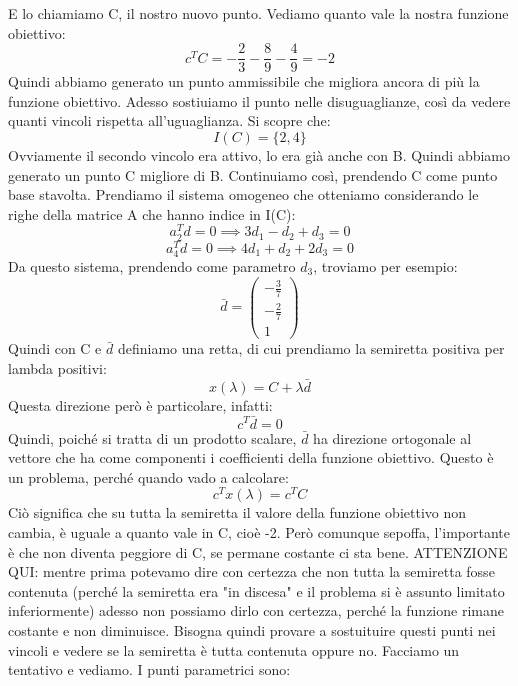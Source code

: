 E lo chiamiamo C, il nostro nuovo punto. Vediamo quanto vale la nostra funzione obiettivo:
\begin{equation*}
    c^TC = -\frac{2}{3}-\frac{8}{9}-\frac{4}{9} = -2
\end{equation*}
Quindi abbiamo generato un punto ammissibile che migliora ancora di più la funzione obiettivo. Adesso sostiuiamo il punto nelle disuguaglianze, così da vedere quanti vincoli rispetta all'uguaglianza. Si scopre che:
\begin{equation*}
    I(C) = \{2,4\}
\end{equation*}
Ovviamente il secondo vincolo era attivo, lo era già anche con B. Quindi abbiamo generato un punto C migliore di B. Continuiamo così, prendendo C come punto base stavolta. Prendiamo il sistema omogeneo che otteniamo considerando le righe della matrice A che hanno indice in I(C):
\begin{equation*}
    a_2^Td = 0 \implies 3d_1 - d_2 + d_3 = 0
\end{equation*}
\begin{equation*}
    a_4^Td = 0 \implies 4d_1 + d_2 + 2d_3 = 0
\end{equation*}
Da questo sistema, prendendo come parametro $d_3$, troviamo per esempio:
\begin{equation*}
    \bar{d} = \begin{pmatrix}
        -\frac{3}{7}\\
        -\frac{2}{7}\\
        1
    \end{pmatrix}
\end{equation*}
Quindi con C e $\bar{d}$ definiamo una retta, di cui prendiamo la semiretta positiva per lambda positivi:
\begin{equation*}
    x(\lambda) = C + \lambda \bar{d}
\end{equation*}
Questa direzione però è particolare, infatti:
\begin{equation*}
    c^T\bar{d} = 0
\end{equation*}
Quindi, poiché si tratta di un prodotto scalare, $\bar{d}$ ha direzione ortogonale al vettore che ha come componenti i coefficienti della funzione obiettivo. Questo è un problema, perché quando vado a calcolare:
\begin{equation*}
    c^Tx(\lambda) = c^TC
\end{equation*}
Ciò significa che su tutta la semiretta il valore della funzione obiettivo non cambia, è uguale a quanto vale in C, cioè -2. Però comunque sepoffa, l'importante è che non diventa peggiore di C, se permane costante ci sta bene. ATTENZIONE QUI: mentre prima potevamo dire con certezza che non tutta la semiretta fosse contenuta (perché la semiretta era "in discesa" e il problema si è assunto limitato inferiormente) adesso non possiamo dirlo con certezza, perché la funzione rimane costante e non diminuisce. Bisogna quindi provare a sostuituire questi punti nei vincoli e vedere se la semiretta è tutta contenuta oppure no. Facciamo un tentativo e vediamo. I punti parametrici sono:
